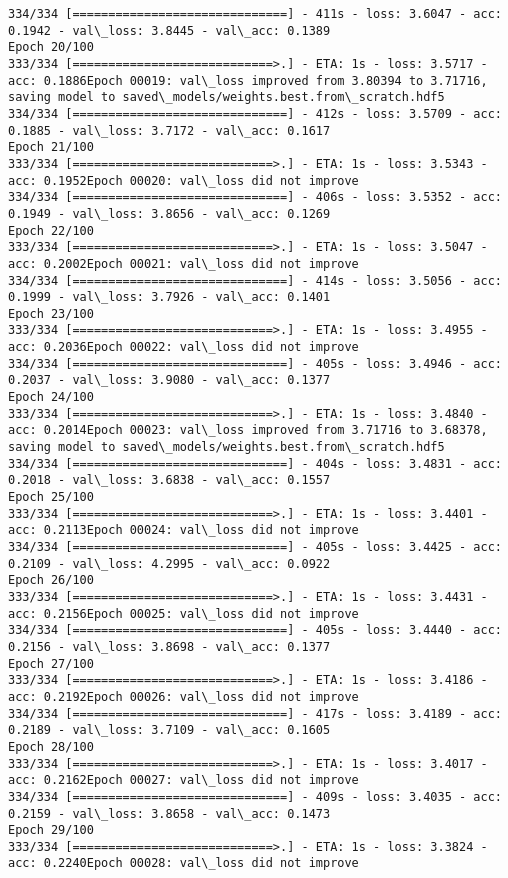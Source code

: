 \documentclass[11pt]{article}
\begin{document}
\begin{Verbatim}[commandchars=\\\{\}]
334/334 [==============================] - 411s - loss: 3.6047 - acc: 0.1942 - val\_loss: 3.8445 - val\_acc: 0.1389
Epoch 20/100
333/334 [============================>.] - ETA: 1s - loss: 3.5717 - acc: 0.1886Epoch 00019: val\_loss improved from 3.80394 to 3.71716, saving model to saved\_models/weights.best.from\_scratch.hdf5
334/334 [==============================] - 412s - loss: 3.5709 - acc: 0.1885 - val\_loss: 3.7172 - val\_acc: 0.1617
Epoch 21/100
333/334 [============================>.] - ETA: 1s - loss: 3.5343 - acc: 0.1952Epoch 00020: val\_loss did not improve
334/334 [==============================] - 406s - loss: 3.5352 - acc: 0.1949 - val\_loss: 3.8656 - val\_acc: 0.1269
Epoch 22/100
333/334 [============================>.] - ETA: 1s - loss: 3.5047 - acc: 0.2002Epoch 00021: val\_loss did not improve
334/334 [==============================] - 414s - loss: 3.5056 - acc: 0.1999 - val\_loss: 3.7926 - val\_acc: 0.1401
Epoch 23/100
333/334 [============================>.] - ETA: 1s - loss: 3.4955 - acc: 0.2036Epoch 00022: val\_loss did not improve
334/334 [==============================] - 405s - loss: 3.4946 - acc: 0.2037 - val\_loss: 3.9080 - val\_acc: 0.1377
Epoch 24/100
333/334 [============================>.] - ETA: 1s - loss: 3.4840 - acc: 0.2014Epoch 00023: val\_loss improved from 3.71716 to 3.68378, saving model to saved\_models/weights.best.from\_scratch.hdf5
334/334 [==============================] - 404s - loss: 3.4831 - acc: 0.2018 - val\_loss: 3.6838 - val\_acc: 0.1557
Epoch 25/100
333/334 [============================>.] - ETA: 1s - loss: 3.4401 - acc: 0.2113Epoch 00024: val\_loss did not improve
334/334 [==============================] - 405s - loss: 3.4425 - acc: 0.2109 - val\_loss: 4.2995 - val\_acc: 0.0922
Epoch 26/100
333/334 [============================>.] - ETA: 1s - loss: 3.4431 - acc: 0.2156Epoch 00025: val\_loss did not improve
334/334 [==============================] - 405s - loss: 3.4440 - acc: 0.2156 - val\_loss: 3.8698 - val\_acc: 0.1377
Epoch 27/100
333/334 [============================>.] - ETA: 1s - loss: 3.4186 - acc: 0.2192Epoch 00026: val\_loss did not improve
334/334 [==============================] - 417s - loss: 3.4189 - acc: 0.2189 - val\_loss: 3.7109 - val\_acc: 0.1605
Epoch 28/100
333/334 [============================>.] - ETA: 1s - loss: 3.4017 - acc: 0.2162Epoch 00027: val\_loss did not improve
334/334 [==============================] - 409s - loss: 3.4035 - acc: 0.2159 - val\_loss: 3.8658 - val\_acc: 0.1473
Epoch 29/100
333/334 [============================>.] - ETA: 1s - loss: 3.3824 - acc: 0.2240Epoch 00028: val\_loss did not improve

\end{Verbatim}
\end{document}
